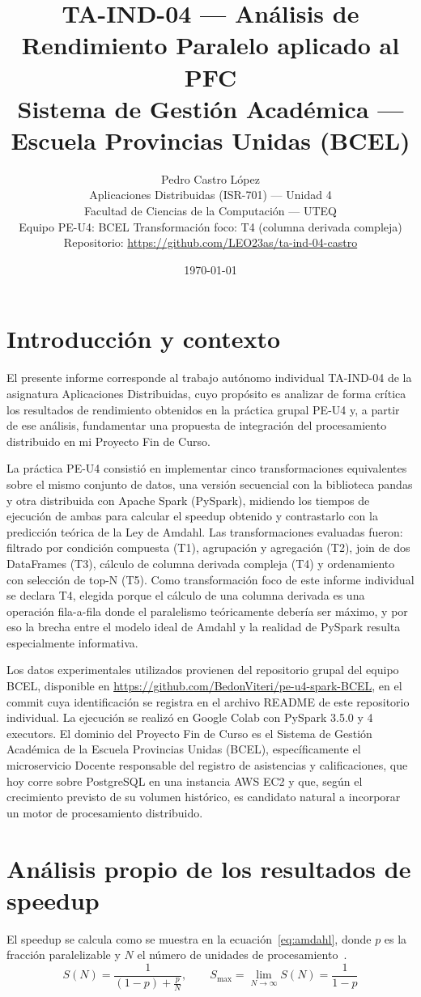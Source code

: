 \documentclass[11pt,a4paper]{article}
\title{TA-IND-04 --- Análisis de Rendimiento Paralelo aplicado al PFC \\
\large Sistema de Gestión Académica --- Escuela Provincias Unidas (BCEL)}
\author{Pedro Castro López \\
\small Aplicaciones Distribuidas (ISR-701) --- Unidad 4 \\
\small Facultad de Ciencias de la Computación --- UTEQ \\
\small Equipo PE-U4: BCEL \quad Transformación foco: T4 (columna derivada compleja) \\
\small Repositorio: \url{https://github.com/LEO23as/ta-ind-04-castro}}
\date{\today}
\begin{document}
\maketitle

\section{Introducción y contexto}
El presente informe corresponde al trabajo autónomo individual TA-IND-04 de la asignatura Aplicaciones Distribuidas, cuyo propósito es analizar de forma crítica los resultados de rendimiento obtenidos en la práctica grupal PE-U4 y, a partir de ese análisis, fundamentar una propuesta de integración del procesamiento distribuido en mi Proyecto Fin de Curso.

La práctica PE-U4 consistió en implementar cinco transformaciones equivalentes sobre el mismo conjunto de datos, una versión secuencial con la biblioteca pandas y otra distribuida con Apache Spark (PySpark), midiendo los tiempos de ejecución de ambas para calcular el speedup obtenido y contrastarlo con la predicción teórica de la Ley de Amdahl. Las transformaciones evaluadas fueron: filtrado por condición compuesta (T1), agrupación y agregación (T2), join de dos DataFrames (T3), cálculo de columna derivada compleja (T4) y ordenamiento con selección de top-N (T5). Como transformación foco de este informe individual se declara T4, elegida porque el cálculo de una columna derivada es una operación fila-a-fila donde el paralelismo teóricamente debería ser máximo, y por eso la brecha entre el modelo ideal de Amdahl y la realidad de PySpark resulta especialmente informativa.

Los datos experimentales utilizados provienen del repositorio grupal del equipo BCEL, disponible en \url{https://github.com/BedonViteri/pe-u4-spark-BCEL}, en el commit cuya identificación se registra en el archivo README de este repositorio individual. La ejecución se realizó en Google Colab con PySpark 3.5.0 y 4 executors. El dominio del Proyecto Fin de Curso es el Sistema de Gestión Académica de la Escuela Provincias Unidas (BCEL), específicamente el microservicio Docente responsable del registro de asistencias y calificaciones, que hoy corre sobre PostgreSQL en una instancia AWS EC2 y que, según el crecimiento previsto de su volumen histórico, es candidato natural a incorporar un motor de procesamiento distribuido.

\section{Análisis propio de los resultados de speedup}
El speedup se calcula como se muestra en la ecuación~\eqref{eq:amdahl}, donde $p$ es la fracción paralelizable y $N$ el número de unidades de procesamiento~\cite{leal2026, lehuy2023}.
\begin{equation}
S(N) = \frac{1}{(1-p) + \frac{p}{N}}, \qquad S_{\max} = \lim_{N \to \infty} S(N) = \frac{1}{1-p}
\label{eq:amdahl}
\end{equation}
\end{document}
